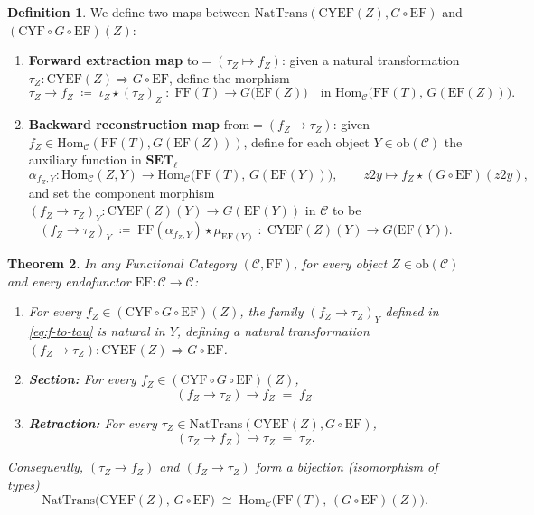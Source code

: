 \documentclass[11pt,a4paper]{article}
\newtheorem{theorem}{Theorem}[section]
\theoremstyle{definition}
\newtheorem{definition}[theorem]{Definition}
\theoremstyle{remark}
\newcommand{\Set}{\mathbf{SET}}
\newcommand{\Hom}{\mathrm{Hom}}
\newcommand{\NatTrans}{\mathrm{NatTrans}}
\newcommand{\CYF}{\mathrm{CYF}}
\newcommand{\CYEF}{\mathrm{CYEF}}
\newcommand{\FF}{\mathrm{FF}}
\newcommand{\EF}{\mathrm{EF}}
\newcommand{\iotaZ}{\iota_Z}
\begin{document}
\begin{definition}\label{def:witness-maps}
We define two maps between $\NatTrans(\CYEF(Z), G \circ \EF)$ and $(\CYF\circ G\circ\EF)(Z)$:
\begin{enumerate}[label=(\roman*),nosep]
  \item \textbf{Forward extraction map} $\mathrm{to} = (\tau_Z \mapsto f_Z)$: given a natural
  transformation $\tau_Z : \CYEF(Z) \Rightarrow G \circ \EF$, define the morphism
  \begin{equation}\label{eq:tau-to-f}
    \tau_Z \to f_Z \;\coloneqq\; \iotaZ \star (\tau_Z)_Z
    \;:\; \FF(T) \longrightarrow G\bigl(\EF(Z)\bigr)
    \quad\text{in }\Hom_{\mathcal{C}}\bigl(\FF(T),\, G(\EF(Z))\bigr).
  \end{equation}
  \item \textbf{Backward reconstruction map} $\mathrm{from} = (f_Z \mapsto \tau_Z)$: given
  $f_Z \in \Hom_{\mathcal{C}}(\FF(T), G(\EF(Z)))$, define for each object $Y \in \mathrm{ob}(\mathcal{C})$
  the auxiliary function in $\Set_\ell$
  \[
    \alpha_{f_Z, Y} : \Hom_{\mathcal{C}}(Z, Y) \longrightarrow \Hom_{\mathcal{C}}\bigl(\FF(T),\, G(\EF(Y))\bigr),
    \qquad
    z2y \longmapsto f_Z \star (G \circ \EF)(z2y),
  \]
  and set the component morphism $(f_Z \to \tau_Z)_Y : \CYEF(Z)(Y) \to G(\EF(Y))$ in $\mathcal{C}$ to be
  \begin{equation}\label{eq:f-to-tau}
    (f_Z \to \tau_Z)_Y \;\coloneqq\; \FF(\alpha_{f_Z, Y}) \star \mu_{\EF(Y)}
    \;:\; \CYEF(Z)(Y) \longrightarrow G\bigl(\EF(Y)\bigr).
  \end{equation}
\end{enumerate}
\end{definition}

\begin{theorem}\label{thm:coendoyoneda}
In any Functional Category $(\mathcal{C}, \FF)$, for every object $Z \in \mathrm{ob}(\mathcal{C})$ and
every endofunctor $\EF : \mathcal{C} \to \mathcal{C}$:
\begin{enumerate}[label=(\roman*),nosep]
  \item For every $f_Z \in (\CYF\circ G\circ\EF)(Z)$, the family $(f_Z \to \tau_Z)_Y$ defined in
  \eqref{eq:f-to-tau} is natural in $Y$, defining a natural transformation
  $(f_Z \to \tau_Z) : \CYEF(Z) \Rightarrow G \circ \EF$.
\vspace{4 pt}
  \item \textbf{Section:} For every $f_Z \in (\CYF\circ G\circ\EF)(Z)$,
  \[
    (f_Z \to \tau_Z) \to f_Z \;=\; f_Z.
  \]
\vspace{4 pt}
  \item \textbf{Retraction:} For every
  $\tau_Z \in \NatTrans(\CYEF(Z), G \circ \EF)$,
  \[
    (\tau_Z \to f_Z) \to \tau_Z \;=\; \tau_Z.
  \]
\end{enumerate}
Consequently, $(\tau_Z \to f_Z)$ and $(f_Z \to \tau_Z)$ form a bijection (isomorphism of types)
\[
  \NatTrans\bigl(\CYEF(Z),\, G \circ \EF\bigr)
  \;\cong\;
  \Hom_{\mathcal{C}}\bigl(\FF(T),\, (G \circ \EF)(Z)\bigr).
\]
\end{theorem}
\end{document}
